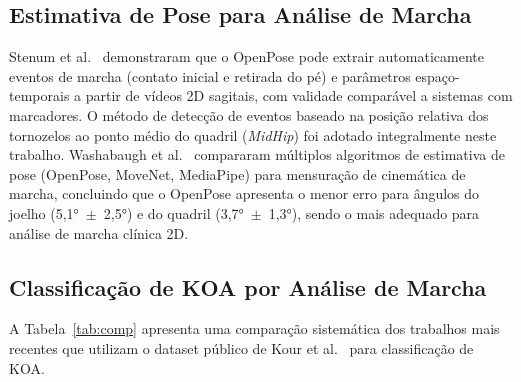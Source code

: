 \documentclass[a4paper,12pt]{article}
\begin{document}
\subsection{Estimativa de Pose para Análise de Marcha}

Stenum et al.~\cite{Stenum2021} demonstraram que o OpenPose pode extrair
automaticamente eventos de marcha (contato inicial e retirada do pé) e parâmetros
espaço-temporais a partir de vídeos 2D sagitais, com validade comparável a sistemas
com marcadores. O método de detecção de eventos baseado na posição relativa dos
tornozelos ao ponto médio do quadril (\textit{MidHip}) foi adotado integralmente neste
trabalho. Washabaugh et al.~\cite{Washabaugh2022} compararam múltiplos algoritmos de
estimativa de pose (OpenPose, MoveNet, MediaPipe) para mensuração de cinemática de
marcha, concluindo que o OpenPose apresenta o menor erro para ângulos do joelho
(5,1°~$\pm$~2,5°) e do quadril (3,7°~$\pm$~1,3°), sendo o mais adequado para
análise de marcha clínica 2D.

\subsection{Classificação de KOA por Análise de Marcha}

A Tabela~\ref{tab:comp} apresenta uma comparação sistemática dos trabalhos mais
recentes que utilizam o dataset público de Kour et al.~\cite{Kour2022} para
classificação de KOA.
\end{document}
